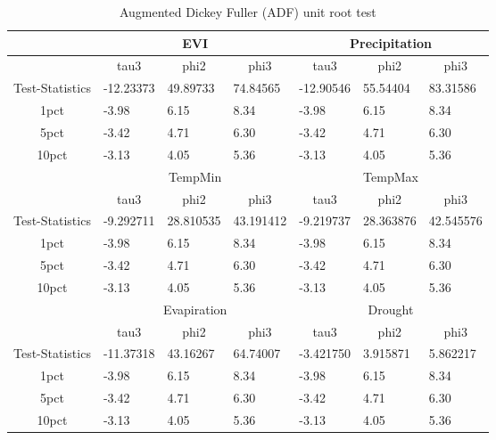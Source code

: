 \begin{table}[]
	\label{(ADF) unit root test}
	\caption{Augmented Dickey Fuller (ADF) unit root test }
	\centering
	\addtolength{\tabcolsep}{4pt}
	\begin{tabularx}{\textwidth}{@{}cllllll@{}}
		\toprule
		& \multicolumn{3}{c}{EVI}   & \multicolumn{3}{c}{Precipitation}  \\ \midrule
		\multicolumn{1}{c}{} & \multicolumn{1}{c}{tau3} & \multicolumn{1}{c}{phi2} & \multicolumn{1}{c}{phi3} & \multicolumn{1}{c}{tau3} & \multicolumn{1}{c}{phi2} &\multicolumn{1}{c}{phi3}\\ \midrule
		
		Test-Statistics&-12.23373&49.89733&74.84565&-12.90546&55.54404&83.31586\\
		1pct&-3.98&6.15&8.34&-3.98&6.15&8.34\\
		5pct&-3.42&4.71&6.30&-3.42&4.71&6.30\\
		10pct&-3.13&4.05&5.36&-3.13&4.05&5.36\\ \bottomrule
		& \multicolumn{3}{c}{TempMin}   & \multicolumn{3}{c}{TempMax}  \\ \midrule
		\multicolumn{1}{c}{} & \multicolumn{1}{c}{tau3} & \multicolumn{1}{c}{phi2} & \multicolumn{1}{c}{phi3} & \multicolumn{1}{c}{tau3} & \multicolumn{1}{c}{phi2} &\multicolumn{1}{c}{phi3}\\ \midrule
		
		Test-Statistics&-9.292711&28.810535&43.191412&-9.219737&28.363876&42.545576\\
		1pct&-3.98&6.15&8.34&-3.98&6.15&8.34\\
		5pct&-3.42&4.71&6.30&-3.42&4.71&6.30\\
		10pct&-3.13&4.05&5.36&-3.13&4.05&5.36\\ \bottomrule
		
		& \multicolumn{3}{c}{Evapiration}   & \multicolumn{3}{c}{Drought}  \\ \midrule
		\multicolumn{1}{c}{} & \multicolumn{1}{c}{tau3} & \multicolumn{1}{c}{phi2} & \multicolumn{1}{c}{phi3} & \multicolumn{1}{c}{tau3} & \multicolumn{1}{c}{phi2} &\multicolumn{1}{c}{phi3}\\ \midrule
		
		Test-Statistics&-11.37318&43.16267&64.74007&-3.421750&3.915871&5.862217\\
		1pct&-3.98&6.15&8.34&-3.98&6.15&8.34\\
		5pct&-3.42&4.71&6.30&-3.42&4.71&6.30\\
		10pct&-3.13&4.05&5.36&-3.13&4.05&5.36\\
		
		\midrule\bottomrule
	\end{tabularx}
\end{table}
